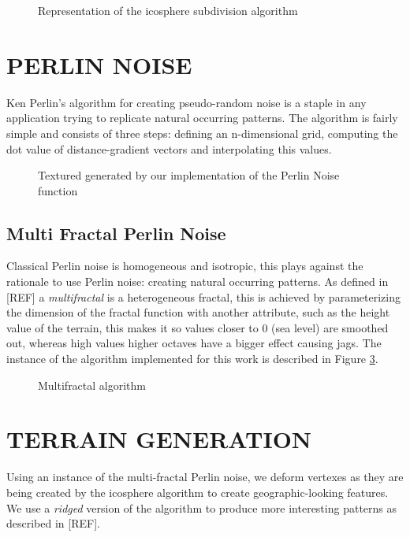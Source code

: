 \documentclass[a4paper,twoside]{article}
\begin{document}
\begin{figure}
\caption{Representation of the icosphere subdivision algorithm}
\label{fig_isa}
\end{figure}

\section{\uppercase{Perlin Noise}}
\label{sec:pnoise}
\noindent Ken Perlin's algorithm for creating pseudo-random noise is a staple in any application trying to replicate natural occurring patterns. The algorithm is fairly simple and consists of three steps: defining an n-dimensional grid, computing the dot value of distance-gradient vectors and interpolating this values.

\begin{figure}
\caption{Textured generated by our implementation of the Perlin Noise function}
\label{fig_pn}
\end{figure}

\subsection{Multi Fractal Perlin Noise}
\label{sec:mfpnois}
Classical Perlin noise is homogeneous and isotropic, this plays against the rationale to use Perlin noise: creating natural occurring patterns.  As defined in [REF] a \textit{multifractal} is a heterogeneous fractal, this is achieved by parameterizing the dimension of the fractal function with another attribute, such as the height value of the terrain, this makes it so values closer to 0 (sea level) are smoothed out, whereas high values higher octaves have a bigger effect causing jags. The instance of the algorithm implemented for this work is described in Figure \ref{fig_mf}.

\begin{figure}
\caption{Multifractal algorithm}
\label{fig_mf}
\end{figure}

\section{\uppercase{Terrain Generation}}
\label{sec:tgeneration}

\noindent Using an instance of the multi-fractal Perlin noise, we deform vertexes as they are being created by the icosphere algorithm to create geographic-looking features. We use a \textit{ridged} version of the algorithm to produce more interesting patterns as described in [REF].
\end{document}
